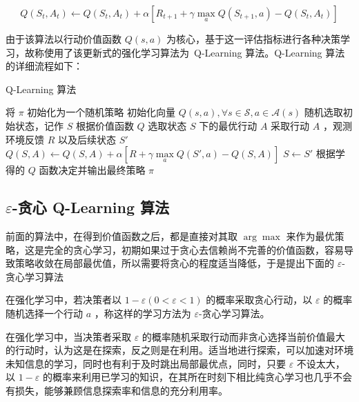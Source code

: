 \begin{equation}\label{eq:qlearning}
    Q(S_t,A_t)\leftarrow Q(S_t,A_t)+\alpha\left[R_{t+1}+\gamma  \max\limits_aQ(S_{t+1},a)-Q(S_t,A_t)\right]
\end{equation}

由于该算法以行动价值函数 $Q(s,a)$ 为核心，基于这一评估指标进行各种决策学习，故称使用了该更新式的强化学习算法为{\jiacu\ Q-Learning 算法}。Q-Learning 算法的详细流程如下：

\begin{algorithm}[H]
    \caption{Q-Learning 算法}
    \begin{algorithmic}[1] %
        \State 将 $\pi$ 初始化为一个随机策略
        \State 初始化向量 $Q(s,a), \forall s\in \mathcal S,a\in \mathcal{A}(s)$
        \Loop
        \State 随机选取初始状态，记作 $S$
        \Repeat
        \State 根据价值函数 $Q$ 选取状态 $S$ 下的最优行动 $A$
        \State 采取行动 $A$ ，观测环境反馈 $R$ 以及后续状态 $S'$
        \State $Q(S,A)\leftarrow Q(S,A)+\alpha\left[R+\gamma  \max\limits_aQ(S',a)-Q(S,A)\right]$
        \State $S\leftarrow S'$
        \EndLoop
        \State
        \State 根据学得的 $Q$ 函数决定并输出最终策略 $\pi$
    \end{algorithmic}
\end{algorithm}

\subsection{$\varepsilon$-贪心 Q-Learning 算法}

前面的算法中，在得到价值函数之后，都是直接对其取 $\arg\max$ 来作为最优策略，这是完全的贪心学习\cite{edmonds1971matroids}\cite{cormen2009introduction}，初期如果过于贪心去信赖尚不完善的价值函数，容易导致策略收敛在局部最优值，所以需要将贪心的程度适当降低，于是提出下面的 $\varepsilon$-贪心学习算法

\begin{Definition}
    在强化学习中，若决策者以 $1-\varepsilon(0<\varepsilon<1)$ 的概率采取贪心行动，以 $\varepsilon$ 的概率随机选择一个行动 $a$ ，称这样的学习方法为 $\varepsilon$-贪心学习算法。
\end{Definition}

在强化学习中，当决策者采取 $\varepsilon$ 的概率随机采取行动而非贪心选择当前价值最大的行动时，认为这是在{\jiacu 探索}，反之则是在{\jiacu 利用}。适当地进行探索，可以加速对环境未知信息的学习，同时也有利于及时跳出局部最优点，同时，只要 $\varepsilon$ 不设太大，以 $1-\varepsilon$ 的概率来利用已学习的知识，在其所在时刻下相比纯贪心学习也几乎不会有损失，能够兼顾信息探索率和信息的充分利用率。

